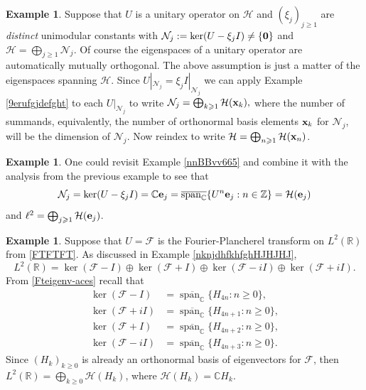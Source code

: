 \documentclass{dis}
\theoremstyle{plain}
\theoremstyle{definition}
\newtheorem{Example}[equation]{Example}
\def\C{\mathbb{C}}
\def\R{\mathbb{R}}
\def\Z{\mathbb{Z}}
\renewcommand{\geq}{\geqslant}
\renewcommand{\vec}[1]{{\bf #1}}
\newcommand{\0}{{\color{lightgray}0}}
\begin{document}
\begin{Example}
Suppose that $U$ is a unitary operator on $\mathcal{H}$ and $(\xi_j)_{j \geq 1}$ are {\em distinct} unimodular constants with
$\mathcal{N}_j := \ker (U  - \xi_j I) \not=  \{\vec{0}\}$ and
$\mathcal{H} = \bigoplus_{j \geq 1} \mathcal{N}_j.$
Of course the eigenspaces of a unitary operator are automatically mutually orthogonal. The above assumption is just a matter of the eigenspaces spanning  $\mathcal{H}$. Since $U|_{\mathcal{N}_j} = \xi_j I|_{\mathcal{N}_j}$ we can apply Example \ref{9erufgjdefght} to each $U|_{\mathcal{N}_j}$ to write
$\mathcal{N}_{j} = \bigoplus_{k \geq 1} \mathcal{H}(\vec{x}_k),$ where the number of summands, equivalently, the number of orthonormal basis elements $\vec{x}_k$ for $\mathcal{N}_j$,  will be the dimension of $\mathcal{N}_j$. Now reindex to
write $\mathcal{H} = \bigoplus_{n \geq 1} \mathcal{H}(\vec{x}_n)$.
\end{Example}

\begin{Example}
One could revisit Example \ref{nnBBvv665} and combine it with the analysis from the previous example to see that
$$\mathcal{N}_j = \ker(U - \xi_j I) = \C \vec{e}_j = \overline{\operatorname{span}_{\C}}\{U^{n} \vec{e}_j: n \in \Z\} =  \mathcal{H}(\vec{e}_j)$$ and
$\ell^2 = \bigoplus_{j \geq 1} \mathcal{H}(\vec{e}_j)$.
\end{Example}

\begin{Example}\label{FTHkkk}
Suppose that  $U = \mathcal{F}$ is the Fourier-Plancherel transform on $L^2(\R)$ from \eqref{FTFTFT}. As discussed in Example \ref{nknjdhfkhfghHJHJHJ},
$$L^2(\R) = \ker (\mathcal{F} - I) \oplus \ker (\mathcal{F} + I) \oplus \ker (\mathcal{F} - i I) \oplus \ker(\mathcal{F} + i I).$$
From \eqref{Fteigenv-aces} recall that 
\begin{align*}
\ker (\mathcal{F} - I) & = \overline{\operatorname{span}_{\C}}\{H_{4n}: n \geq 0\},\\
\ker (\mathcal{F} + i I) & =   \overline{\operatorname{span}_{\C}}\{H_{4n + 1}: n \geq 0\},\\
\ker (\mathcal{F} + I) & =   \overline{\operatorname{span}_{\C}}\{H_{4n + 2}: n \geq 0\},\\
\ker (\mathcal{F} - i I) & =   \overline{\operatorname{span}_{\C}}\{H_{4n + 3}: n \geq 0\}.
\end{align*}
Since $(H_k)_{k \geq 0}$ is already an orthonormal basis of eigenvectors  for $\mathcal{F}$, then
$L^2(\R) = \bigoplus_{k \geq 0} \mathcal{H}(H_k)$, where $\mathcal{H}(H_k) = \C H_k$.
\end{Example}
\end{document}
